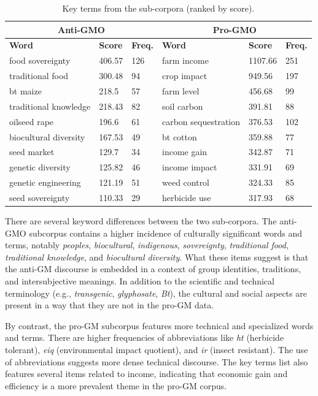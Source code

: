 \begin{table}[H]
\begin{footnotesize}
\centering
\def\arraystretch{1.1}%
\begin{tabular}{llllll}
\hline
\multicolumn{3}{c}{\textbf{Anti-GMO}}    & \multicolumn{3}{c}{\textbf{Pro-GMO}}   \\
\hline
\textbf{Word}        & \textbf{Score}  & \textbf{Freq.} & \textbf{Word}        & \textbf{Score}   & \textbf{Freq.} \\
\hline
food sovereignty & 406.57 & 126   & farm income & 1107.66 & 251   \\
traditional food & 300.48 & 94    & crop impact & 949.56  & 197   \\
bt maize & 218.5  & 57 & farm level & 456.68  & 99    \\
traditional knowledge & 218.43 & 82 & soil carbon & 391.81  & 88    \\
oilseed rape & 196.6  & 61 & carbon sequestration & 376.53  & 102   \\
biocultural diversity & 167.53 & 49 & bt cotton & 359.88  & 77    \\
seed market & 129.7 & 34 & income gain & 342.87  & 71    \\
genetic diversity & 125.82 & 46 & income impact & 331.91  & 69    \\
genetic engineering & 121.19 & 51 & weed control & 324.33  & 85    \\
seed sovereignty & 110.33 & 29 & herbicide use & 317.93  & 68   
\end{tabular}
\caption{Key terms from the sub-corpora (ranked by score).}
\label{tab:table1}
\end{footnotesize}
\end{table}

There are several keyword differences between the two sub-corpora. The anti-GMO subcorpus contains a higher incidence of culturally significant words and terms, notably \textit{peoples}, \textit{biocultural}, \textit{indigenous}, \textit{sovereignty}, \textit{traditional food}, \textit{traditional knowledge}, and \textit{biocultural diversity}. What these items suggest is that the anti-GM discourse is embedded in a context of group identities, traditions, and intersubjective meanings. In addition to the scientific and technical terminology (e.g., \textit{transgenic}, \textit{glyphosate}, \textit{Bt}), the cultural and social aspects are present in a way that they are not in the pro-GM data. 

By contrast, the pro-GM subcorpus features more technical and specialized words and terms. There are higher frequencies of abbreviations like \textit{ht} (herbicide tolerant), \textit{eiq} (environmental impact quotient), and \textit{ir} (insect resistant). The use of abbreviations suggests more dense technical discourse. The key terms list also features several items related to income, indicating that economic gain and efficiency is a more prevalent theme in the pro-GM corpus. 

